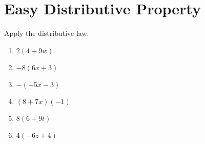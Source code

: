 \documentclass[12pt,letterpaper]{article}
\begin{document}
\section*{Easy Distributive Property}
Apply the distributive law.
\begin{enumerate}

\item $2(4 + 9w)$

\addvspace{1.3in}

\item $-8(6x + 3)$

\addvspace{1.3in}

\item $-(-5x - 3)$

\addvspace{1.3in}
\item $(8 + 7x)(-1)$

\addvspace{1.3in}
\item $8(6 + 9t)$

\addvspace{1.3in}
\item $4(-6z + 4)$

\addvspace{1.3in}
\end{enumerate}

\clearpage
\end{document}

